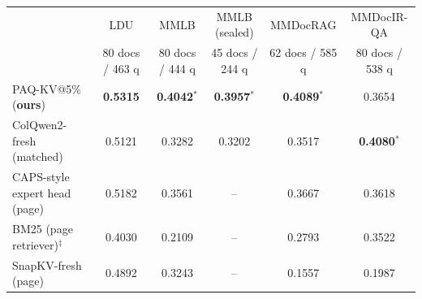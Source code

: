 \documentclass[letterpaper]{article} %
\newcommand{\paqc}{\textsc{PAQ-KV}}
\begin{document}
\begin{table}[t]
\centering\footnotesize
\setlength{\tabcolsep}{4pt}
\begin{tabular}{lccccc}
\toprule
 & LDU & MMLB & MMLB (sealed) & MMDocRAG & MMDocIR-QA \\
 & \scriptsize 80 docs / 463 q & \scriptsize 80 docs / 444 q & \scriptsize 45 docs / 244 q & \scriptsize 62 docs / 585 q & \scriptsize 80 docs / 538 q \\
\midrule
\paqc{}@5\% (\textbf{ours}) & \textbf{0.5315} & \textbf{0.4042}$^{*}$ & \textbf{0.3957}$^{*}$ & \textbf{0.4089}$^{*}$ & 0.3654 \\
ColQwen2-fresh (matched) & 0.5121 & 0.3282 & 0.3202 & 0.3517 & \textbf{0.4080}$^{*}$ \\
\midrule
CAPS-style expert head (page) & 0.5182 & 0.3561 & -- & 0.3667 & 0.3618 \\
BM25 (page retriever)$^\ddagger$ & 0.4030 & 0.2109 & -- & 0.2793 & 0.3522 \\
SnapKV-fresh (page) & 0.4892 & 0.3243 & -- & 0.1557 & 0.1987 \\

\end{tabular}
\end{table}
\end{document}
